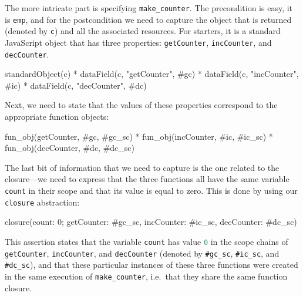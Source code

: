 \documentclass{llncs}
\def\jsinline{\lstinline[language=JavaScript, basicstyle=\small]}
\begin{document}
\bigskip
The more intricate part is specifying \jsinline|make_counter|. The precondition is easy, it is \jsinline|emp|, and for the postcondition we need to capture the object that is returned (denoted by \jsinline|c|) and all the associated resources. For starters, it is a standard JavaScript object that has three properties: \jsinline|getCounter|, \jsinline|incCounter|, and \jsinline|decCounter|.

\begin{lstjs}
standardObject(c) * 
dataField(c, "getCounter", #gc) * dataField(c, "incCounter", #ic) * dataField(c, "decCounter", #dc)
\end{lstjs}

Next, we need to state that the values of these properties correspond to the appropriate function objects:

\begin{lstjs}
fun_obj(getCounter, #gc, #gc_sc) * fun_obj(incCounter, #ic, #ic_sc) * fun_obj(decCounter, #dc, #dc_sc)
\end{lstjs}

The last bit of information that we need to capture is the one related to the closure---we need to express that the three functions all have the same variable \jsinline|count| in their scope and that its value is equal to zero. This is done by using our \jsinline|closure| abstraction:

\begin{lstjs}
closure(count: 0; getCounter: #gc_sc, incCounter: #ic_sc, decCounter: #dc_sc)
\end{lstjs}

This assertion states that the variable \jsinline|count| has value \jsinline|0| in the scope chains of \jsinline|getCounter|, \jsinline|incCounter|, and \jsinline|decCounter| (denoted by \jsinline|#gc_sc|, \jsinline|#ic_sc|, and \jsinline|#dc_sc|), and that these particular instances of these three functions were created in the same execution of \jsinline|make_counter|, i.e.~that they share the same function closure.
\end{document}
